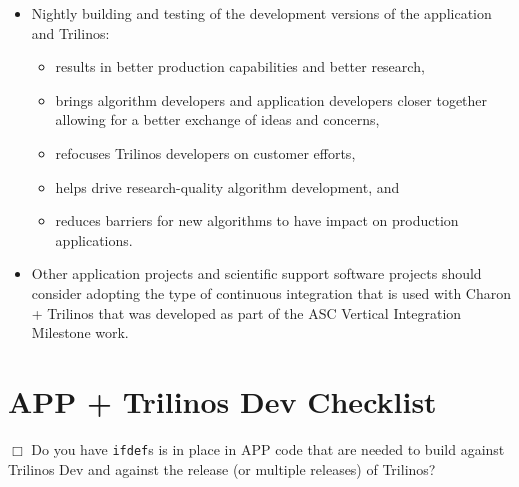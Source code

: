 \documentclass[pdf,ps2pdf,11pt]{SANDreport}
\begin{document}
\begin{itemize}

{}\item Nightly building and testing of the development versions of the
application and Trilinos:

  \begin{itemize}

  {}\item results in better production capabilities and better research,

  {}\item brings algorithm developers and application developers closer
  together allowing for a better exchange of ideas and concerns,

  {}\item refocuses Trilinos developers on customer efforts,

  {}\item helps drive research-quality algorithm development, and
        
  {}\item reduces barriers for new algorithms to have impact on production
  applications.

  \end{itemize}

{}\item Other application projects and scientific support software projects
should consider adopting the type of continuous integration that is used with
Charon + Trilinos that was developed as part of the ASC Vertical Integration
Milestone work.

\end{itemize}

%
\clearpage



%
\appendix


%
\section*{APP + Trilinos Dev Checklist}
\label{sec:checkist}
%

$\Box$ Do you have {}\texttt{ifdef}s is in place in APP code that are needed
to build against Trilinos Dev and against the release (or multiple releases)
of Trilinos?
\end{document}
